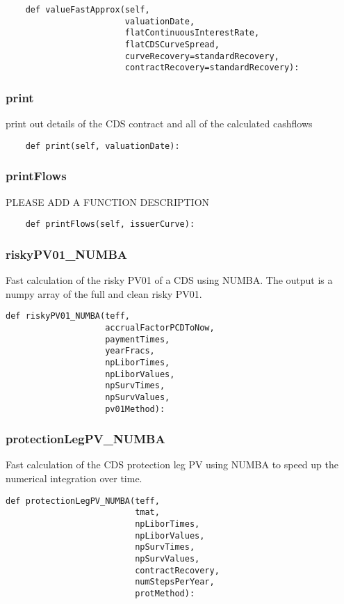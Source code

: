 \documentclass[twoside,11pt]{book}
\begin{document}
\begin{lstlisting}
    def valueFastApprox(self,
                        valuationDate,
                        flatContinuousInterestRate,
                        flatCDSCurveSpread,
                        curveRecovery=standardRecovery,
                        contractRecovery=standardRecovery):
\end{lstlisting}

\subsubsection*{{\bf print}}
print out details of the CDS contract and all of the calculated cashflows  

\begin{lstlisting}
    def print(self, valuationDate):
\end{lstlisting}

\subsubsection*{{\bf printFlows}}
PLEASE ADD A FUNCTION DESCRIPTION

\begin{lstlisting}
    def printFlows(self, issuerCurve):
\end{lstlisting}

\subsubsection*{{\bf riskyPV01\_NUMBA}}
Fast calculation of the risky PV01 of a CDS using NUMBA. The output is a numpy array of the full and clean risky PV01. 

\begin{lstlisting}
def riskyPV01_NUMBA(teff,
                    accrualFactorPCDToNow,
                    paymentTimes,
                    yearFracs,
                    npLiborTimes,
                    npLiborValues,
                    npSurvTimes,
                    npSurvValues,
                    pv01Method):
\end{lstlisting}

\subsubsection*{{\bf protectionLegPV\_NUMBA}}
Fast calculation of the CDS protection leg PV using NUMBA to speed up the numerical integration over time.  

\begin{lstlisting}
def protectionLegPV_NUMBA(teff,
                          tmat,
                          npLiborTimes,
                          npLiborValues,
                          npSurvTimes,
                          npSurvValues,
                          contractRecovery,
                          numStepsPerYear,
                          protMethod):
\end{lstlisting}
\end{document}

